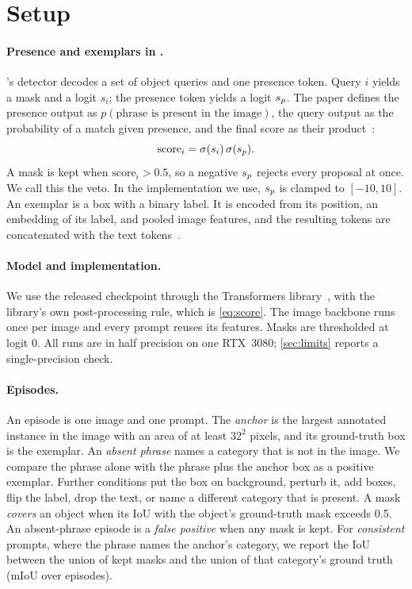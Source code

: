 \section{Setup}
\label{sec:setup}

\paragraph{Presence and exemplars in \sam{}.}
\sam{}'s detector decodes a set of object queries and one presence token.
Query $i$ yields a mask and a logit $s_i$; the presence token yields a logit $s_p$.
The paper defines the presence output as $p(\text{phrase is present in the image})$, the query output as the probability of a match given presence, and the final score as their product~\cite{carion2026sam3}:
\begin{equation}
    \mathrm{score}_i = \sigma(s_i)\,\sigma(s_p).
    \label{eq:score}
\end{equation}
A mask is kept when $\mathrm{score}_i > 0.5$, so a negative $s_p$ rejects every proposal at once.
We call this the veto.
In the implementation we use, $s_p$ is clamped to $[-10, 10]$.
An exemplar is a box with a binary label.
It is encoded from its position, an embedding of its label, and pooled image features, and the resulting tokens are concatenated with the text tokens~\cite{carion2026sam3}.

\paragraph{Model and implementation.}
We use the released \sam{} checkpoint through the Transformers library~\cite{wolf2020transformers}, with the library's own post-processing rule, which is \cref{eq:score}.
The image backbone runs once per image and every prompt reuses its features.
Masks are thresholded at logit 0.
All runs are in half precision on one RTX~3080; \cref{sec:limits} reports a single-precision check.

\paragraph{Episodes.}
An episode is one image and one prompt.
The \emph{anchor} is the largest annotated instance in the image with an area of at least $32^2$ pixels, and its ground-truth box is the exemplar.
An \emph{absent phrase} names a category that is not in the image.
We compare the phrase alone with the phrase plus the anchor box as a positive exemplar.
Further conditions put the box on background, perturb it, add boxes, flip the label, drop the text, or name a different category that is present.
A mask \emph{covers} an object when its IoU with the object's ground-truth mask exceeds 0.5.
An absent-phrase episode is a \emph{false positive} when any mask is kept.
For \emph{consistent} prompts, where the phrase names the anchor's category, we report the IoU between the union of kept masks and the union of that category's ground truth (mIoU over episodes).

